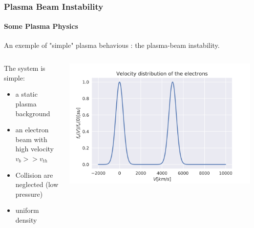 \documentclass[sans, aspectratio=169]{beamer}
\begin{document}
\begin{frame}
	\frametitle{Plasma Beam Instability} 
	\framesubtitle{Some Plasma Physics} 

	An exemple of "simple" plasma behavious : the plasma-beam instability.

\begin{columns}

\begin{column}{0.55\linewidth}
The system is simple:
	\begin{itemize}
		\item a static plasma background
		\item an electron beam with high velocity $v_b >> v_{th}$
		\item Collision are neglected (low pressure)
		\item uniform density
	\end{itemize}
\end{column}

\begin{column}{0.35\linewidth}
\includegraphics[scale=0.4]{images/plasma_beam_f_v.png} 
\end{column}

\end{columns}	

\end{frame}
\end{document}
